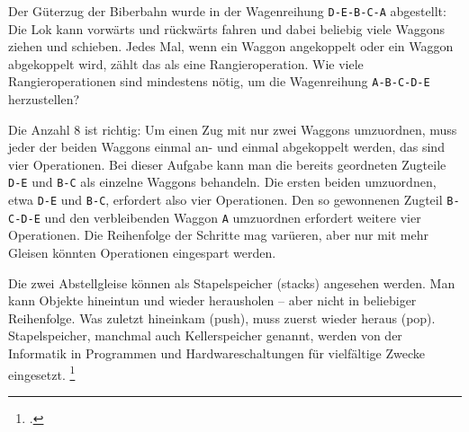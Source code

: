 \documentclass{bschlangaul-aufgabe}
\begin{document}

Der Güterzug der Biberbahn wurde in der Wagenreihung \verb|D-E-B-C-A|
abgestellt: Die Lok kann vorwärts und rückwärts fahren und dabei
beliebig viele Waggons ziehen und schieben. Jedes Mal, wenn ein Waggon
angekoppelt oder ein Waggon abgekoppelt wird, zählt das als eine
Rangieroperation. Wie viele Rangieroperationen sind mindestens nötig, um
die Wagenreihung \verb|A-B-C-D-E| herzustellen?

\begin{bAntwort}
Die Anzahl 8 ist richtig: Um einen Zug mit nur zwei Waggons umzuordnen,
muss jeder der beiden Waggons einmal an- und einmal abgekoppelt werden,
das sind vier Operationen. Bei dieser Aufgabe kann man die bereits
geordneten Zugteile \verb|D-E| und \verb|B-C| als einzelne Waggons
behandeln. Die ersten beiden umzuordnen, etwa \verb|D-E| und \verb|B-C|,
erfordert also vier Operationen. Den so gewonnenen Zugteil
\verb|B-C-D-E| und den verbleibenden Waggon \verb|A| umzuordnen
erfordert weitere vier Operationen. Die Reihenfolge der Schritte mag
varüeren, aber nur mit mehr Gleisen könnten Operationen eingespart
werden.

Die zwei Abstellgleise können als Stapelspeicher (stacks) angesehen
werden. Man kann Objekte hineintun und wieder herausholen – aber nicht
in beliebiger Reihenfolge. Was zuletzt hineinkam (push), muss zuerst
wieder heraus (pop). Stapelspeicher, manchmal auch Kellerspeicher
genannt, werden von der Informatik in Programmen und Hardwareschaltungen
für vielfältige Zwecke eingesetzt.
\footcite[Seite 23]{net:pdf:informatik-biber-2012}
\end{bAntwort}
\end{document}
